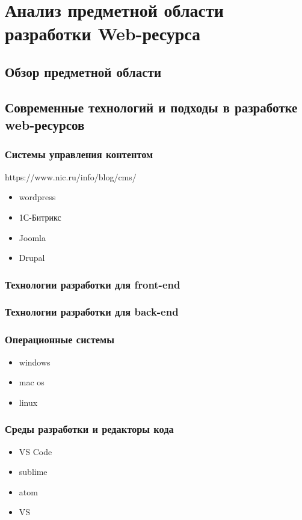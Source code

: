 \section{Анализ предметной области разработки Web-ресурса}
    \subsection{Обзор предметной области}
    \subsection{Современные технологий и подходы в разработке web-ресурсов}
        \subsubsection{Системы управления контентом}
            https://www.nic.ru/info/blog/cms/
            \begin{itemize}
                \item wordpress
                \item 1С-Битрикс
                \item Joomla
                \item Drupal
            \end{itemize}

        \subsubsection{Технологии разработки для front-end}
        \subsubsection{Технологии разработки для back-end}
        \subsubsection{Операционные системы}
            \begin{itemize}
                \item windows
                \item mac os
                \item linux
            \end{itemize}
            
        \subsubsection{Среды разработки и редакторы кода}
            \begin{itemize}
                \item VS Code
                \item sublime
                \item atom
                \item VS
            \end{itemize}


